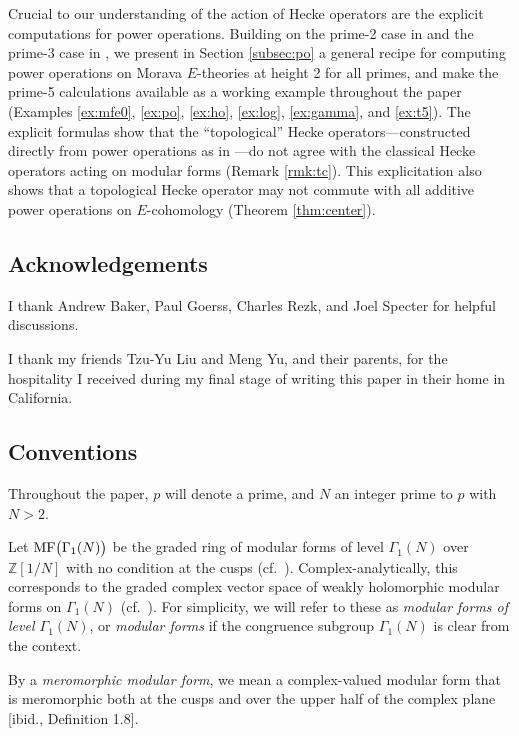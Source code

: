 \documentclass{gtpart}
\theoremstyle{definition}
\theoremstyle{remark}
\newcommand{\mb}[1]{\mathbb{#1}}
\newcommand{\BZ}{{\mb Z}}
\newcommand{\MF}{{\rm MF}}
\newcommand{\G}{\Gamma}
\renewcommand{\=}{\approx}
\renewcommand{\-}{\sim}
\numberwithin{equation}{section}
\numberwithin{thm}{section}
\begin{document}
Crucial to our understanding of the action of Hecke operators are 
the explicit computations for power operations.  
Building on the prime-2 case in \cite{h2p2} and the prime-3 case in \cite{p3}, 
we present in Section \ref{subsec:po} a general recipe for computing 
power operations on Morava $E$-theories at height 2 for all primes, 
and make the prime-5 calculations available 
as a working example throughout the paper (Examples \ref{ex:mfe0}, \ref{ex:po}, 
\ref{ex:ho}, \ref{ex:log}, \ref{ex:gamma}, and \ref{ex:t5}).  The explicit formulas 
show that the ``topological'' Hecke operators---constructed directly from power 
operations as in \cite[Proposition 3.6.2]{Ando95}---do not agree with the 
classical Hecke operators acting on modular forms (Remark \ref{rmk:tc}).  This explicitation also 
shows that a topological Hecke operator may not commute with all additive power 
operations on $E$-cohomology (Theorem \ref{thm:center}).  



\subsection{Acknowledgements}

I thank Andrew Baker, Paul Goerss, Charles Rezk, and Joel Specter for helpful discussions.  

I thank my friends Tzu-Yu Liu and Meng Yu, and their parents, for the hospitality I received 
during my final stage of writing this paper in their home in California.  



\subsection{Conventions}

Throughout the paper, $p$ will denote a prime, and $N$ an integer prime to $p$ with $N > 2$.  

Let $\MF\big(\G_1(N)\big)$ be the graded ring of modular forms of level $\G_1(N)$ over $\BZ[1/N]$ 
with no condition at the cusps (cf.~\cite[Section 1.2]{padicprop}).  
Complex-analytically, this corresponds to the graded complex vector space of weakly holomorphic modular forms on $\G_1(N)$ (cf.~\cite[Definition 1.12]{web}).  
For simplicity, we will refer to these as {\em modular forms of level $\G_1(N)$}, or {\em modular forms} if the congruence subgroup $\G_1(N)$ is clear from the context.  

By a {\em meromorphic modular form}, we mean a complex-valued modular form 
that is meromorphic both at the cusps and over the upper half of the complex plane [ibid., Definition 1.8].  
\end{document}
